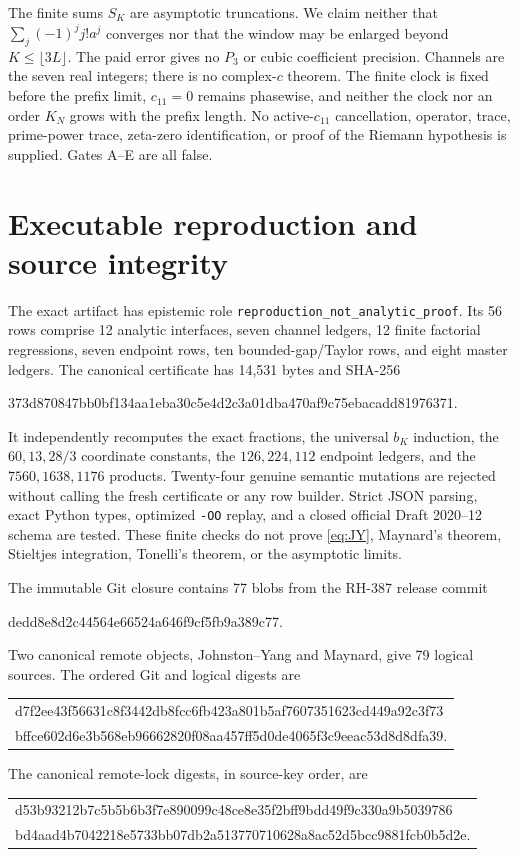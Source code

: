 \documentclass[11pt]{article}
\theoremstyle{definition}
\theoremstyle{remark}
\begin{document}
The finite sums $S_K$ are asymptotic truncations.  We claim neither that
$\sum_j(-1)^jj!a^j$ converges nor that the window may be enlarged beyond
$K\le\lfloor3L\rfloor$.  The paid error gives no $P_3$ or cubic
coefficient precision.  Channels are the seven real integers; there is
no complex-$c$ theorem.  The finite clock is fixed before the prefix
limit, $c_{11}=0$ remains phasewise, and neither the clock nor an order
$K_N$ grows with the prefix length.  No active-$c_{11}$ cancellation,
operator, trace, prime-power trace, zeta-zero identification, or proof of
the Riemann hypothesis is supplied.  Gates A--E are all false.

\section{Executable reproduction and source integrity}
\label{sec:artifact}

The exact artifact has epistemic role
\texttt{reproduction\_not\_analytic\_proof}.  Its 56 rows comprise 12
analytic interfaces, seven channel ledgers, 12 finite factorial
regressions, seven endpoint rows, ten bounded-gap/Taylor rows, and eight
master ledgers.  The canonical certificate has 14,531 bytes and SHA-256
\begin{center}
\small\ttfamily
373d870847bb0bf134aa1eba30c5e4d2c3a01dba470af9c75ebacadd81976371.
\end{center}
It independently recomputes the exact fractions, the universal
$b_K$ induction, the $60,13,28/3$ coordinate constants, the
$126,224,112$ endpoint ledgers, and the $7560,1638,1176$ products.
Twenty-four genuine semantic mutations are rejected without calling the
fresh certificate or any row builder.  Strict JSON parsing, exact Python
types, optimized \texttt{-OO} replay, and a closed official Draft
2020--12 schema are tested.  These finite checks do not prove
\eqref{eq:JY}, Maynard's theorem, Stieltjes integration, Tonelli's
theorem, or the asymptotic limits.

The immutable Git closure contains 77 blobs from the RH-387 release
commit
\begin{center}
\small\ttfamily
dedd8e8d2c44564e66524a646f9cf5fb9a389c77.
\end{center}
Two canonical remote objects, Johnston--Yang and Maynard, give 79 logical
sources.  The ordered
Git and logical digests are
\begin{center}
\small\ttfamily
\begin{tabular}{@{}l@{}}
d7f2ee43f56631c8f3442db8fcc6fb423a801b5af7607351623cd449a92c3f73\\
bffce602d6e3b568eb96662820f08aa457ff5d0de4065f3c9eeac53d8d8dfa39.
\end{tabular}
\end{center}
The canonical remote-lock digests, in source-key order, are
\begin{center}
\small\ttfamily
\begin{tabular}{@{}l@{}}
d53b93212b7c5b5b6b3f7e890099c48ce8e35f2bff9bdd49f9c330a9b5039786\\
bd4aad4b7042218e5733bb07db2a513770710628a8ac52d5bcc9881fcb0b5d2e.
\end{tabular}
\end{center}
\end{document}
